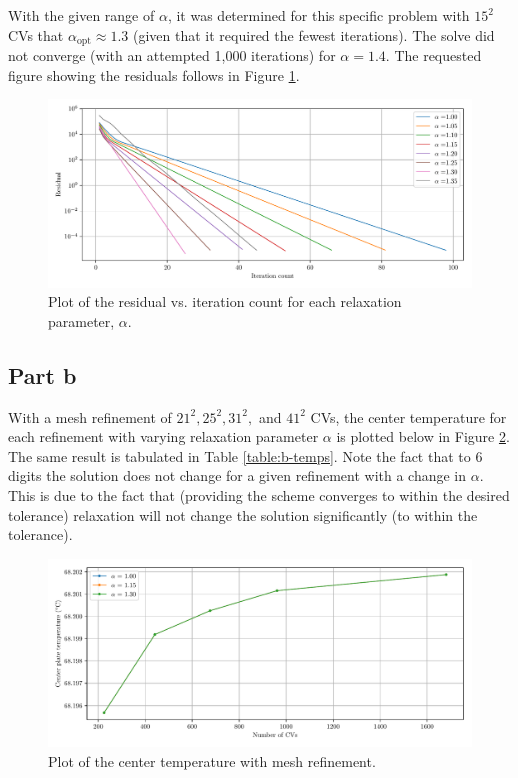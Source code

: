 \documentclass{article}
\begin{document}
With the given range of $\alpha$, it was determined for this specific problem with $15^2$ CVs that $\alpha_\text{opt} \approx 1.3$ (given that it required the fewest iterations). The solve did not converge (with an attempted 1,000 iterations) for $\alpha = 1.4$. The requested figure showing the residuals follows in Figure \ref{fig:a}.

\begin{figure}[H]
	\centering
	\includegraphics[width=\linewidth]{../results/a}
	\caption{Plot of the residual vs. iteration count for each relaxation parameter, $\alpha$.}
	\label{fig:a}
\end{figure}

\subsection*{Part b}

With a mesh refinement of $21^2, 25^2, 31^2,$ and $41^2$ CVs, the center temperature for each refinement with varying relaxation parameter $\alpha$ is plotted below in Figure \ref{fig:b-temps}. The same result is tabulated in Table \ref{table:b-temps}. Note the fact that to 6 digits the solution does not change for a given refinement with a change in $\alpha$. This is due to the fact that (providing the scheme converges to within the desired tolerance) relaxation will not change the solution significantly (to within the tolerance).

\begin{figure}[H]
	\centering
	\includegraphics[width=\linewidth]{../results/b-temps}
	\caption{Plot of the center temperature with mesh refinement.}
	\label{fig:b-temps}
\end{figure}
\end{document}
